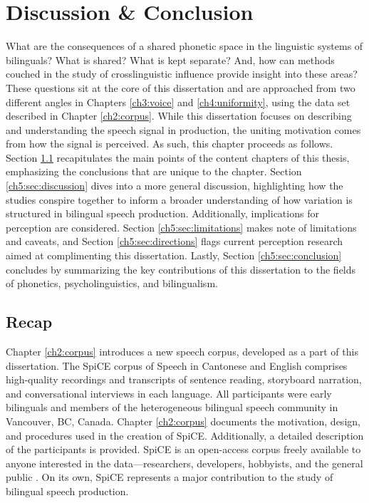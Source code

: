 \chapter{Discussion \& Conclusion}\label{ch5:discussion}

What are the consequences of a shared phonetic space in the linguistic systems of bilinguals? What is shared? What is kept separate? And, how can methods couched in the study of crosslinguistic influence provide insight into these areas? These questions sit at the core of this dissertation and are approached from two different angles in Chapters \ref{ch3:voice} and \ref{ch4:uniformity}, using the data set described in Chapter \ref{ch2:corpus}. While this dissertation focuses on describing and understanding the speech signal in production, the uniting motivation comes from how the signal is perceived. As such, this chapter proceeds as follows. Section \ref{ch5:sec:recap} recapitulates the main points of the content chapters of this thesis, emphasizing the conclusions that are unique to the chapter. Section \ref{ch5:sec:discussion} dives into a more general discussion, highlighting how the studies conspire together to inform a broader understanding of how variation is structured in bilingual speech production. Additionally, implications for perception are considered. Section \ref{ch5:sec:limitations} makes note of limitations and caveats, and Section \ref{ch5:sec:directions} flags current perception research aimed at complimenting this dissertation. Lastly, Section \ref{ch5:sec:conclusion} concludes by summarizing the key contributions of this dissertation to the fields of phonetics, psycholinguistics, and bilingualism.

\section{Recap}\label{ch5:sec:recap}

Chapter \ref{ch2:corpus} introduces a new speech corpus, developed as a part of this dissertation. The SpiCE corpus of Speech in Cantonese and English comprises high-quality recordings and transcripts of sentence reading, storyboard narration, and conversational interviews in each language. All participants were early bilinguals and members of the heterogeneous bilingual speech community in Vancouver, BC, Canada. Chapter \ref{ch2:corpus} documents the motivation, design, and procedures used in the creation of SpiCE. Additionally, a detailed description of the participants is provided. SpiCE is an open-access corpus freely available to anyone interested in the data---researchers, developers, hobbyists, and the general public \citep{johnson_2021_spice}. On its own, SpiCE represents a major contribution to the study of bilingual speech production. 

